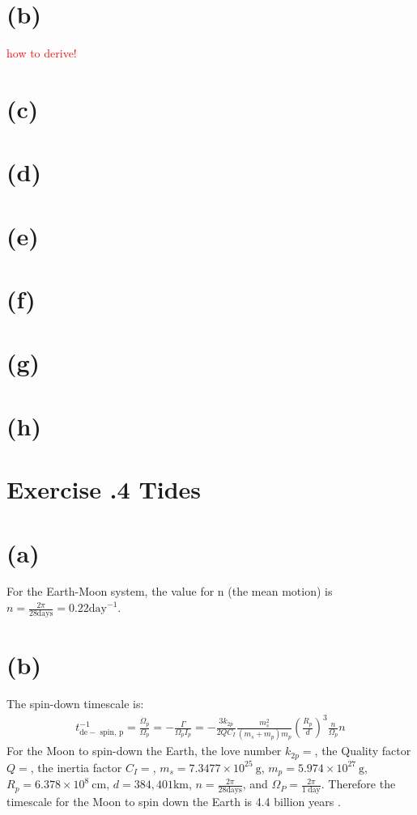 \documentclass[a4paper,12pt]{article}
\newcommand{\cm}{\mathrm{cm}}
\newcommand{\g}{\mathrm{g}}
\begin{document}
\section*{(b)}
\textcolor{red}{how to derive!}

\section*{(c)}

\section*{(d)}

\section*{(e)}

\section*{(f)}

\section*{(g)}

\section*{(h)}


\section*{\textbf{Exercise \uppercase\expandafter{}.4 Tides}}
\section*{(a)}
For the Earth-Moon system, the value for n (the mean motion) is $n = \frac{2\pi}{28 \text{days}} = 0.22 \text{day}^{-1}$.

\section*{(b)}
The spin-down timescale is:
\begin{align*}
    t_{\mathrm{de}-\text { spin, } \mathrm{p}}^{-1}=\frac{\dot{\Omega}_p}{\Omega_p}=-\frac{\Gamma}{\Omega_p I_p}=-\frac{3 k_{2 p}}{2 Q C_I} \frac{m_s^2}{\left(m_s+m_p\right) m_p}\left(\frac{R_p}{d}\right)^3 \frac{n}{\Omega_p} n
\end{align*}
For the Moon to spin-down the Earth, the love number $k_{2p} = $, the Quality factor $Q = $, 
the inertia factor $C_I = $, $m_s = 7.3477\times 10^{25} \ \g$, $m_p =5.974\times 10^{27} \ \g $, $R_p = 6.378\times 10^8 \ \cm$, $d = 384,401 \text{km}$, $n = \frac{2\pi}{28 \text{days}}$, and $\Omega_P = \frac{2\pi}{1 \ \text{day}}$. 
Therefore the timescale for the Moon to spin down the Earth is 4.4 billion years .
\end{document}
